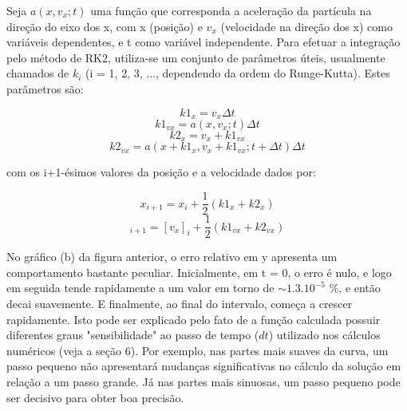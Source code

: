 \documentclass[a4paper, brazilian, 8pt, final]{article}
\begin{document}
\begin{multicols}{2}
\quad Seja $a(x,v_{x};t)$ uma função que corresponda a aceleração da partícula na direção do eixo dos x, com x (posição) e $v_{x}$ (velocidade na direção dos x) como variáveis dependentes, e t como variável independente. Para efetuar a integração pelo método de RK2, utiliza-se um conjunto de parâmetros úteis, usualmente chamados de $k_{i}$ (i = 1, 2, 3, ..., dependendo da ordem do Runge-Kutta). Estes parâmetros são:

\begin{equation}
k1_{x} = v_{x}\Delta t 
\end{equation}
\begin{equation}
k1_{vx} = a(x, v_{x};t)\Delta t 
\end{equation} 
\begin{equation}
k2_{x} = v_{x} + k1_{vx}
\end{equation}  
\begin{equation}
k2_{vx} = a(x + k1_{x},v_{x} + k1_{vx};t + \Delta t) \Delta t
\end{equation} 

com os i+1-ésimos valores da posição e a velocidade dados por:

\begin{equation}
x_{i + 1} = x_{i} + \frac{1}{2}(k1_{x} + k2_{x})
\end{equation}
\begin{equation}
[v_x]_{i + 1} = [v_x]_{i} + \frac{1}{2}(k1_{vx} + k2_{vx})
\end{equation}

\quad No gráfico (b) da figura anterior, o erro relativo em y apresenta um comportamento bastante peculiar. Inicialmente, em t = 0, o erro é nulo, e logo em seguida tende rapidamente a um valor em torno de $\sim 1.3.10^{-5}$ \%, e então decai suavemente. E finalmente, ao final do intervalo, começa a crescer rapidamente. Isto pode ser explicado pelo fato de a função calculada possuir diferentes graus "sensibilidade" ao passo de tempo ($dt$) utilizado nos cálculos numéricos (veja a seção 6). Por exemplo, nas partes mais suaves da curva, um passo pequeno não apresentará mudanças significativas no cálculo da solução em relação a um passo grande. Já nas partes mais sinuosas, um passo pequeno pode ser decisivo para obter boa precisão. 
\end{multicols}
\end{document}
